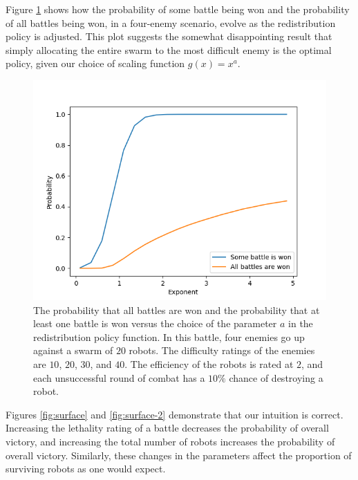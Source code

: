 \documentclass[11pt]{article}
\theoremstyle{definition}
\begin{document}
Figure \ref{fig:some-all-battle-won} shows how the probability of some battle
being won and the probability of all battles being won, in a four-enemy
scenario, evolve as the redistribution policy is adjusted.
%
This plot suggests the somewhat disappointing result that simply allocating the
entire swarm to the most difficult enemy is the optimal policy, given our
choice of scaling function $g(x) = x^a$.

\begin{figure}
    \begin{center}
        \includegraphics[width=\textwidth]{../figs/some-all-probability-vs-exp.png}
    \end{center}
    \caption{
        The probability that all battles are won and the probability that at
        least one battle is won versus the choice of the parameter $a$ in the
        redistribution policy function.
        In this battle, four enemies go up against a swarm of $20$ robots.
        The difficulty ratings of the enemies are $10$, $20$, $30$, and $40$.
        The efficiency of the robots is rated at $2$, and each unsuccessful
        round of combat has a $10\%$ chance of destroying a robot.
    }
    \label{fig:some-all-battle-won}
\end{figure}

Figures \ref{fig:surface} and \ref{fig:surface-2} demonstrate that our
intuition is correct.
Increasing the lethality rating of a battle decreases the probability of
overall victory, and increasing the total number of robots increases the
probability of overall victory.
Similarly, these changes in the parameters affect the proportion of surviving
robots as one would expect.
\end{document}
